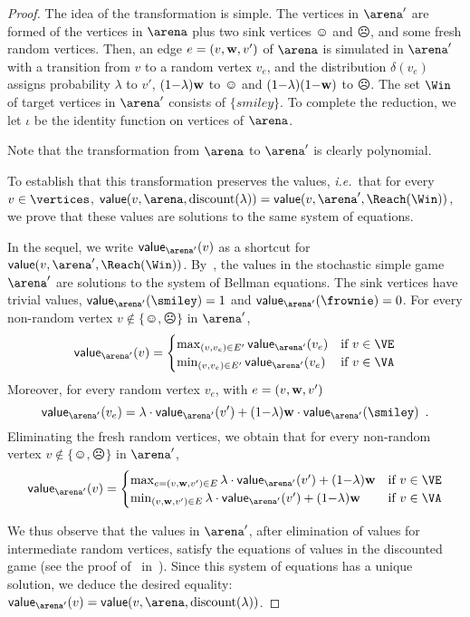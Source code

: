\begin{proof}
The idea of the transformation is simple. The vertices in $\arena'$
are formed of the vertices in $\arena$ plus two sink vertices
$\smiley$ and $\frownie$, and some fresh random vertices. Then, an
edge $e = (v,\mathbf{w},v')$ of $\arena$ is simulated in $\arena'$ with
a transition from $v$ to a random vertex $v_e$, and the distribution
$\delta(v_e)$ assigns probability $\lambda$ to $v'$,
$(1{-}\lambda)\mathbf{w}$ to $\smiley$ and $(1{-}\lambda)(1{-}\mathbf{w})$
to $\frownie$. The set $\Win$ of target vertices in $\arena'$
consists of $\{smiley\}$. To complete the reduction, we let $\iota$
be the identity function on vertices of $\arena$.

Note that the transformation from $\arena$ to $\arena'$ is clearly
polynomial.


To establish that this transformation preserves the values,
\emph{i.e.}\ that for every $v \in \vertices$,
$\mathsf{value}(v,\arena,\textrm{discount}(\lambda)) =
\mathsf{value}(v,\arena',\Reach(\Win))$, we prove that these
values are solutions to the same system of equations.

In the sequel, we write $\mathsf{value}_{\arena'}(v)$ as a shortcut
for $\mathsf{value}(v,\arena',\Reach(\Win))$.
By~, the values in the stochastic simple game
$\arena'$ are solutions to the system of Bellman equations. The sink
vertices have trivial values, $\mathsf{value}_{\arena'}(\smiley) =1$
and $\mathsf{value}_{\arena'}(\frownie) =0$.  For every non-random
vertex $v \notin \{\smiley,\frownie\}$ in $\arena'$,
\[
  \mathsf{value}_{\arena'}(v)
= \begin{cases}   \max_{(v,v_e) \in E'}  \mathsf{value}_{\arena'}(v_e) & \text{if}\ v \in \VE \\
   \min_{(v,v_e) \in E'}  \mathsf{value}_{\arena'}(v_e)  & \text{if}\ v \in \VA
 \end{cases}
 \]
 Moreover, for every random vertex $v_e$, with $e=(v,\mathbf{w},v')$
 \[
 \mathsf{value}_{\arena'}(v_e) = \lambda \cdot
 \mathsf{value}_{\arena'}(v') + (1{-}\lambda) \weight \cdot
 \mathsf{value}_{\arena'}(\smiley) \enspace.
\]
 Eliminating the fresh
random vertices, we obtain that for every non-random vertex
$v \notin \{\smiley,\frownie\}$ in $\arena'$,
\[
  \mathsf{value}_{\arena'}(v) =
  \begin{cases}
    \max_{e=(v,\weight,v') \in E}  \lambda \cdot
 \mathsf{value}_{\arena'}(v') + (1{-}\lambda) \weight & \text{if}\ v \in \VE\\
    \min_{(v,\weight,v') \in E}  \lambda \cdot
 \mathsf{value}_{\arena'}(v') + (1{-}\lambda) \weight & \text{if}\ v \in \VA
 \end{cases}
  \]

  We thus observe that the values in $\arena'$, after elimination of
  values for intermediate random vertices, satisfy the equations of
  values in the discounted game (see the proof
  of~ in~). Since
  this system of equations has a unique solution, we deduce the
  desired equality:
  $\mathsf{value}_{\arena'}(v) =
  \mathsf{value}(v,\arena,\textrm{discount}(\lambda))$.
\end{proof}

